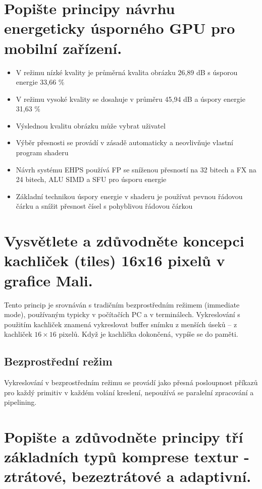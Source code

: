 	
\section{Popište principy návrhu energeticky úsporného GPU pro mobilní zařízení.}
	\begin{itemize}
		\setlength\itemsep{0em}
		\item V režimu nízké kvality je průměrná kvalita obrázku 26,89 dB s úsporou energie 33,66 \%
		\item V režimu vysoké kvality se dosahuje v průměru 45,94 dB a úspory energie 31,63 \%
		\item Výslednou kvalitu obrázku může vybrat uživatel
		\item Výběr přesnosti se provádí v zásadě automaticky a neovlivňuje vlastní program shaderu
		\item Návrh systému EHPS používá FP se sníženou přesností na 32 bitech a FX na 24 bitech, ALU SIMD a SFU pro úsporu energie
		\item Základní technikou úspory energie v shaderu je používat pevnou řádovou čárku a snížit přesnost čísel s pohyblivou řádovou čárkou
	\end{itemize}
	
	
	
	
\section{Vysvětlete a zdůvodněte koncepci kachliček (tiles) 16x16 pixelů v grafice Mali.}
	Tento princip je srovnáván s tradičním bezprostředním režimem (immediate mode), používaným typicky v počítačích PC a v terminálech.
	Vykreslování s použitím kachliček znamená vykreslovat buffer snímku z menších úseků -- z kachliček $16 \times 16$ pixelů. Když je kachlička dokončená, vypíše se do paměti.
	
	\subsection*{Bezprostřední režim}
		Vykreslování v bezprostředním režimu se provádí jako přesná posloupnost příkazů pro každý primitiv v každém volání kreslení, nepoužívá se paralelní zpracování a pipelining.
	
	
	
	
\section{Popište a zdůvodněte principy tří základních typů komprese textur - ztrátové, bezeztrátové a adaptivní.}
